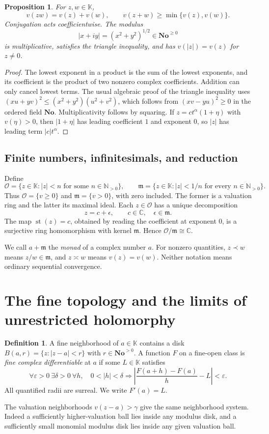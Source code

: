 \documentclass[11pt,a4paper]{article}
\numberwithin{equation}{section}
\newtheorem{proposition}[theorem]{Proposition}
\theoremstyle{definition}
\newtheorem{definition}[theorem]{Definition}
\theoremstyle{remark}
\newcommand{\No}{\mathbf{No}}
\newcommand{\K}{\mathbb K}
\newcommand{\C}{\mathbb C}
\newcommand{\N}{\mathbb N}
\newcommand{\OO}{\mathcal O}
\newcommand{\mm}{\mathfrak m}
\newcommand{\st}{\operatorname{st}}
\begin{document}
\begin{proposition}
\label{prop:valuation}
For $z,w\in\K$,
\[
 v(zw)=v(z)+v(w),\qquad v(z+w)\geq\min\{v(z),v(w)\}.
\]
Conjugation acts coefficientwise. The modulus
\[
 |x+iy|=(x^2+y^2)^{1/2}\in\No^{\geq0}
\]
is multiplicative, satisfies the triangle inequality, and has $v(|z|)=v(z)$ for $z\ne0$.
\end{proposition}
\begin{proof}
The lowest exponent in a product is the sum of the lowest exponents, and its coefficient is the product of two nonzero complex coefficients. Addition can only cancel lowest terms. The usual algebraic proof of the triangle inequality uses
$(xu+yv)^2\leq(x^2+y^2)(u^2+v^2)$, which follows from $(xv-yu)^2\geq0$ in the ordered field $\No$. Multiplicativity follows by squaring. If $z=c t^\alpha(1+\eta)$ with $v(\eta)>0$, then $|1+\eta|$ has leading coefficient $1$ and exponent $0$, so $|z|$ has leading term $|c|t^\alpha$.
\end{proof}

\subsection{Finite numbers, infinitesimals, and reduction}
Define
\[
 \OO=\{z\in\K: |z|<n\text{ for some }n\in\N_{>0}\},\qquad
 \mm=\{z\in\K: |z|<1/n\text{ for every }n\in\N_{>0}\}.
\]
Thus $\OO=\{v\geq0\}$ and $\mm=\{v>0\}$, with zero included. The former is a valuation ring and the latter its maximal ideal. Each $z\in\OO$ has a unique decomposition
\[
 z=c+\epsilon,\qquad c\in\C,\quad\epsilon\in\mm.
\]
The map $\st(z)=c$, obtained by reading the coefficient at exponent $0$, is a surjective ring homomorphism with kernel $\mm$. Hence $\OO/\mm\cong\C$.

We call $a+\mm$ the \emph{monad} of a complex number $a$. For nonzero quantities, $z\prec w$ means $z/w\in\mm$, and $z\asymp w$ means $v(z)=v(w)$. Neither notation means ordinary sequential convergence.

\section{The fine topology and the limits of unrestricted holomorphy}
\label{sec:topology}
\begin{definition}
A fine neighborhood of $a\in\K$ contains a disk
$B(a,r)=\{z:|z-a|<r\}$ with $r\in\No^{>0}$. A function $F$ on a fine-open class is \emph{fine complex differentiable} at $a$ if some $L\in\K$ satisfies
\[
 \forall\varepsilon>0\ \exists\delta>0\ \forall h,
 \quad 0<|h|<\delta\Longrightarrow
 \left|\frac{F(a+h)-F(a)}h-L\right|<\varepsilon.
\]
All quantified radii are surreal. We write $F'(a)=L$.
\end{definition}
The valuation neighborhoods $v(z-a)>\gamma$ give the same neighborhood system. Indeed a sufficiently higher-valuation ball lies inside any modulus disk, and a sufficiently small monomial modulus disk lies inside any given valuation ball.
\end{document}

